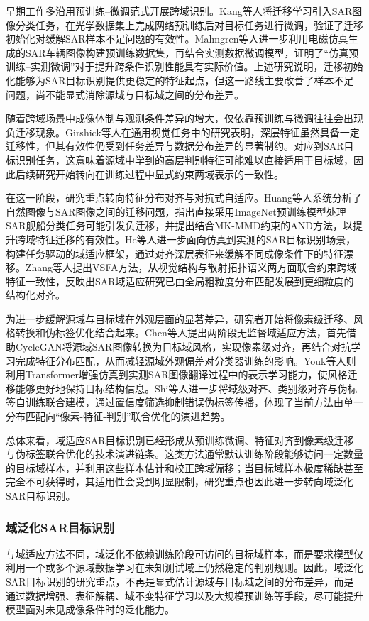 早期工作多沿用预训练--微调范式开展跨域识别。Kang等人\cite{kang2016sar}将迁移学习引入SAR图像分类任务，在光学数据集上完成网络预训练后对目标任务进行微调，验证了迁移初始化对缓解SAR样本不足问题的有效性。Malmgren等人\cite{malmgren2017improving}进一步利用电磁仿真生成的SAR车辆图像构建预训练数据集，再结合实测数据微调模型，证明了“仿真预训练--实测微调”对于提升跨条件识别性能具有实际价值。上述研究说明，迁移初始化能够为SAR目标识别提供更稳定的特征起点，但这一路线主要改善了样本不足问题，尚不能显式消除源域与目标域之间的分布差异。

随着跨域场景中成像体制与观测条件差异的增大，仅依靠预训练与微调往往会出现负迁移现象。Girshick等人\cite{girshick2014rich}在通用视觉任务中的研究表明，深层特征虽然具备一定迁移性，但其有效性仍受到任务差异与数据分布差异的显著制约。对应到SAR目标识别任务，这意味着源域中学到的高层判别特征可能难以直接适用于目标域，因此后续研究开始转向在训练过程中显式约束两域表示的一致性。

在这一阶段，研究重点转向特征分布对齐与对抗式自适应。Huang等人\cite{huang2019and}系统分析了自然图像与SAR图像之间的迁移问题，指出直接采用ImageNet预训练模型处理SAR舰船分类任务可能引发负迁移，并提出结合MK-MMD约束的AND方法，以提升跨域特征迁移的有效性。He等人\cite{he2021sar}进一步面向仿真到实测的SAR目标识别场景，构建任务驱动的域适应框架，通过对齐深层表征来缓解不同成像条件下的特征漂移。Zhang等人\cite{zhang2023vsfa}提出VSFA方法，从视觉结构与散射拓扑语义两方面联合约束跨域特征一致性，反映出SAR域适应研究已由全局粗粒度分布匹配发展到更细粒度的结构化对齐。

为进一步缓解源域与目标域在外观层面的显著差异，研究者开始将像素级迁移、风格转换和伪标签优化结合起来。Chen等人\cite{chen2022pixel}提出两阶段无监督域适应方法，首先借助CycleGAN将源域SAR图像转换为目标域风格，实现像素级对齐，再结合对抗学习完成特征分布匹配，从而减轻源域外观偏差对分类器训练的影响。Youk等人\cite{youk2023transformer}则利用Transformer增强仿真到实测SAR图像翻译过程中的表示学习能力，使风格迁移能够更好地保持目标结构信息。Shi等人\cite{shi2024unsupervised}进一步将域级对齐、类别级对齐与伪标签自训练联合建模，通过置信度筛选抑制错误伪标签传播，体现了当前方法由单一分布匹配向“像素-特征-判别”联合优化的演进趋势。

总体来看，域适应SAR目标识别已经形成从预训练微调、特征对齐到像素级迁移与伪标签联合优化的技术演进链条。这类方法通常默认训练阶段能够访问一定数量的目标域样本，并利用这些样本估计和校正跨域偏移；当目标域样本极度稀缺甚至完全不可获得时，其适用性会受到明显限制，研究重点也因此进一步转向域泛化SAR目标识别。



\subsubsection{域泛化SAR目标识别}
与域适应方法不同，域泛化不依赖训练阶段可访问的目标域样本，而是要求模型仅利用一个或多个源域数据学习在未知测试域上仍然稳定的判别规则。因此，域泛化SAR目标识别的研究重点，不再是显式估计源域与目标域之间的分布差异，而是通过数据增强、表征解耦、域不变特征学习以及大规模预训练等手段，尽可能提升模型面对未见成像条件时的泛化能力。

